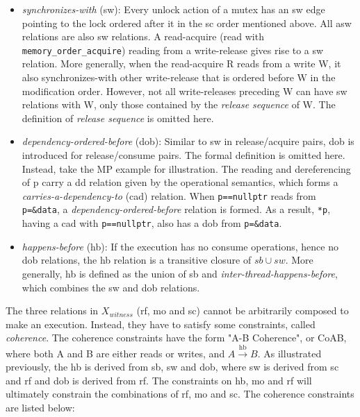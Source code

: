 \begin{itemize}
	\item \textit{synchronizes-with} (sw): Every unlock action of a mutex has an sw edge pointing to the lock ordered after it in the sc order mentioned above. All asw relations are also sw relations. A read-acquire (read with \texttt{memory\_order\_acquire}) reading from a write-release gives rise to a sw relation. More generally, when the read-acquire R reads from a write W, it also synchronizes-with other write-release that is ordered before W in the modification order. However, not all write-releases preceding W can have sw relations with W, only those contained by the \textit{release sequence} of W. The definition of \textit{release sequence} is omitted here.
	\item \textit{dependency-ordered-before} (dob): Similar to sw in release/acquire pairs, dob is introduced for release/consume pairs. The formal definition is omitted here. Instead, take the MP example for illustration. The reading and dereferencing of p carry a dd relation given by the operational semantics, which forms a \textit{carries-a-dependency-to} (cad) relation. 
	When \texttt{p==nullptr} reads from \texttt{p=\&data}, a \textit{dependency-ordered-before} relation is formed.	As a result, \texttt{*p}, having a cad with \texttt{p==nullptr}, also has a dob from \texttt{p=\&data}.
	\item \textit{happens-before} (hb): If the execution has no consume operations, hence no dob relations, the hb relation is a transitive closure of $sb \cup sw$. More generally, hb is defined as the union of sb and \textit{inter-thread-happens-before}, which combines the sw and dob relations.
\end{itemize}


The three relations in $X_{witness}$ (rf, mo and sc) cannot be arbitrarily composed to make an execution. Instead, they have to satisfy some constraints, called \textit{coherence}. The coherence constraints have the form "A-B Coherence", or CoAB, where both A and B are either reads or writes, and $A \xrightarrow{\text{hb}} B$. As illustrated previously, the hb is derived from sb, sw and dob, where sw is derived from sc and rf and dob is derived from rf. The constraints on hb, mo and rf will ultimately constrain the combinations of rf, mo and sc. The coherence constraints are listed below:

